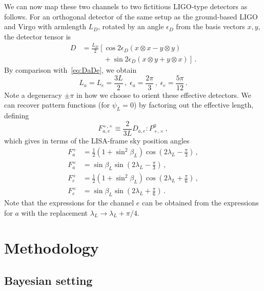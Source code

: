 \documentclass[aps,showpacs,twocolumn,prd,superscriptaddress,nofootinbib]{revtex4-1}
\newcommand{\be}{\begin{equation}}
\newcommand{\ee}{\end{equation}}
\newcommand{\bsub}{\begin{subequations}}
\newcommand{\esub}{\end{subequations}}
\newcommand{\nn}{\nonumber}
\newcommand\lambdaL{{\lambda_{L}}}
\begin{document}
We can now map these two channels to two fictitious LIGO-type detectors as follows. For an orthogonal detector of the same setup as the ground-based LIGO and Virgo with armlength $L_{D}$, rotated by an angle $\epsilon_{D}$ from the basis vectors $x,y$, the detector tensor is
\begin{align}
	D &= \frac{L_{D}}{2} \left[ \cos 2\epsilon_{D} \left( x\otimes x - y\otimes y \right) \right. \nn\\
	& \qquad\quad + \left. \sin 2\epsilon_{D} \left( x\otimes y + y \otimes x\right) \right] \,.
\end{align}
By comparison with~\eqref{eq:DaDe}, we obtain
\be
	L_{a} = L_{e} = \frac{3L}{2} \,, \; \epsilon_{a} = \frac{2\pi}{3} \,, \; \epsilon_{e} = \frac{5\pi}{12} \,.
\ee
Note a degeneracy $\pm \pi$ in how we choose to orient these effective detectors. We can recover pattern functions (for $\psi_{L}=0$) by factoring out the effective length, defining
\be\label{eq:defFapcFepc}
	F_{a,e}^{+,\times} \equiv \frac{2}{3L} D_{a,e} : P_{+,\times}^{0} \,,
\ee
which gives in terms of the LISA-frame sky position angles
\bsub\label{eq:FapcFepc}
\begin{align}
	F_{a}^{+} &= \frac{1}{2} \left( 1 + \sin^{2}\beta_{L} \right) \cos \left(2\lambda_{L} - \frac{\pi}{3} \right) \,,\\
	F_{a}^{\times} &= \sin\beta_{L} \sin \left(2\lambda_{L} - \frac{\pi}{3} \right) \,,\\
	F_{e}^{+} &= \frac{1}{2} \left( 1 + \sin^{2}\beta_{L} \right) \cos \left(2\lambda_{L} + \frac{\pi}{6} \right) \,,\\
	F_{e}^{\times} &= \sin\beta_{L} \sin \left(2\lambda_{L} + \frac{\pi}{6} \right)  \,.
\end{align}
\esub
Note that the expressions for the channel $e$ can be obtained from the expressions for $a$ with the replacement $\lambdaL \rightarrow \lambdaL + \pi/4$.


\section{Methodology}
\label{sec:method}


\subsection{Bayesian setting}
\label{subsec:defbayes}
\end{document}
